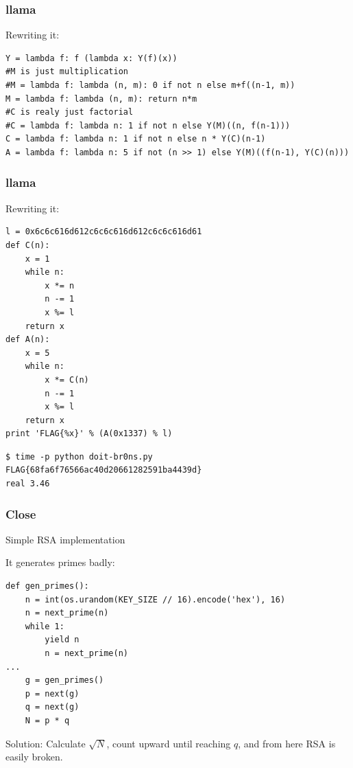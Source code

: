 \documentclass{beamer}
\begin{document}
\begin{frame}[fragile]
    \frametitle{llama}

    Rewriting it:

    \begin{lstlisting}[style=custompy]
Y = lambda f: f (lambda x: Y(f)(x))
#M is just multiplication
#M = lambda f: lambda (n, m): 0 if not n else m+f((n-1, m))
M = lambda f: lambda (n, m): return n*m
#C is realy just factorial
#C = lambda f: lambda n: 1 if not n else Y(M)((n, f(n-1)))
C = lambda f: lambda n: 1 if not n else n * Y(C)(n-1)
A = lambda f: lambda n: 5 if not (n >> 1) else Y(M)((f(n-1), Y(C)(n)))
    \end{lstlisting}
\end{frame}

\begin{frame}[fragile]
    \frametitle{llama}

    Rewriting it:

    \begin{lstlisting}[style=custompy]
l = 0x6c6c616d612c6c6c616d612c6c6c616d61
def C(n):
    x = 1
    while n:
        x *= n
        n -= 1
        x %= l
    return x
def A(n):
    x = 5
    while n:
        x *= C(n)
        n -= 1
        x %= l
    return x
print 'FLAG{%x}' % (A(0x1337) % l)
    \end{lstlisting}
    \pause 

    \begin{lstlisting}[style=customconsole]
$ time -p python doit-br0ns.py 
FLAG{68fa6f76566ac40d20661282591ba4439d}
real 3.46
    \end{lstlisting}
\end{frame}

\begin{frame}[fragile]
    \frametitle{Close}
    
    Simple RSA implementation

    \pause

    It generates primes badly:

    \begin{lstlisting}[style=custompy]
def gen_primes():
    n = int(os.urandom(KEY_SIZE // 16).encode('hex'), 16)
    n = next_prime(n)
    while 1:
        yield n
        n = next_prime(n)
...
    g = gen_primes()
    p = next(g)
    q = next(g)
    N = p * q
    \end{lstlisting}

    \pause

    Solution:
    Calculate $\sqrt{N}$, count upward until reaching $q$, and from here RSA is easily broken.
\end{frame}
\end{document}
